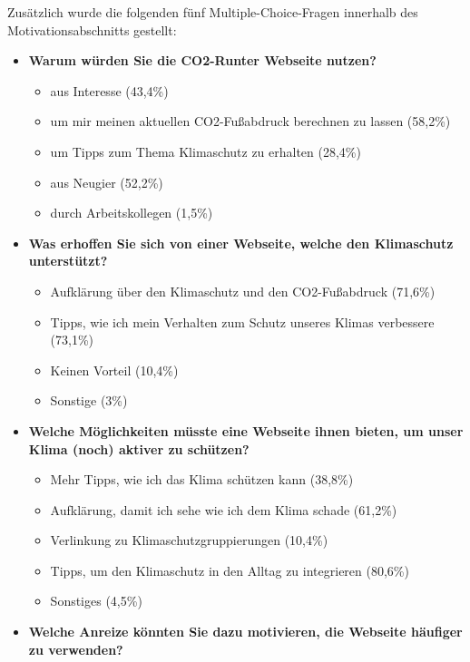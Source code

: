 Zusätzlich wurde die folgenden fünf Multiple-Choice-Fragen innerhalb des Motivationsabschnitts gestellt:

\begin{itemize}
    \item \textbf{Warum würden Sie die CO2-Runter Webseite nutzen?}
          \begin{itemize}
              \item aus Interesse (43,4\%)
              \item um mir meinen aktuellen CO2-Fußabdruck berechnen zu lassen (58,2\%)
              \item um Tipps zum Thema Klimaschutz zu erhalten (28,4\%)
              \item aus Neugier (52,2\%)
              \item durch Arbeitskollegen (1,5\%)
          \end{itemize}
    \item \textbf{Was erhoffen Sie sich von einer Webseite, welche den Klimaschutz unterstützt?}
          \begin{itemize}
              \item Aufklärung über den Klimaschutz und den CO2-Fußabdruck (71,6\%)
              \item Tipps, wie ich mein Verhalten zum Schutz unseres Klimas verbessere (73,1\%)
              \item Keinen Vorteil (10,4\%)
              \item Sonstige (3\%)
          \end{itemize}
    \item \textbf{Welche Möglichkeiten müsste eine Webseite ihnen bieten, um unser Klima (noch) aktiver zu schützen?}
          \begin{itemize}
              \item Mehr Tipps, wie ich das Klima schützen kann (38,8\%)
              \item Aufklärung, damit ich sehe wie ich dem Klima schade (61,2\%)
              \item Verlinkung zu Klimaschutzgruppierungen (10,4\%)
              \item Tipps, um den Klimaschutz in den Alltag zu integrieren (80,6\%)
              \item Sonstiges (4,5\%)
          \end{itemize}
    \item \textbf{Welche Anreize könnten Sie dazu motivieren, die Webseite häufiger zu verwenden?}
          \begin{itemize}

\end{itemize}
\end{itemize}
